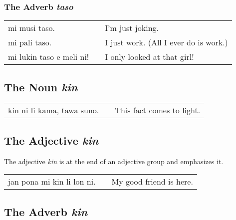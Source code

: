 {\subsubsection*{The Adverb \textit{taso}}
%
%
\begin{supertabular}{p{5,5cm}|ll}
mi musi taso. && I'm just joking. \\
mi pali taso. && I just work. (All I ever do is work.) \\ 
mi lukin taso e meli ni! && I only looked at that girl!  \\
\end{supertabular} 

%
\subsection*{The Noun \textit{kin}}
%
%

\begin{supertabular}{p{5,5cm}|ll}
kin ni li kama, tawa suno. && This fact comes to light. 
\end{supertabular} 

%
\subsection*{The Adjective \textit{kin}}
%
%
The adjective \textit{kin} is at the end of an adjective group and emphasizes it.

\begin{supertabular}{p{5,5cm}|ll}
jan pona mi kin li lon ni. && My good friend is here. \\
\end{supertabular} 

\subsection*{The Adverb \textit{kin}}
%
%

}

